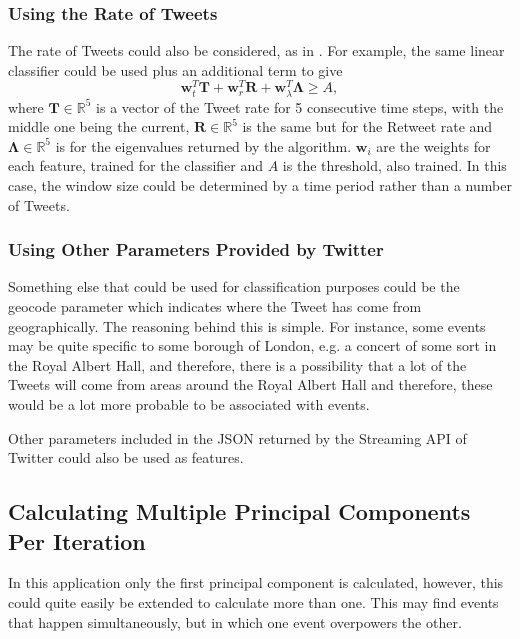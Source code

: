 \documentclass[11pt,a4paper]{article}
\begin{document}
\subsubsection{Using the Rate of Tweets}
The rate of Tweets could also be considered, as in \cite{eventtwitter}. 
For example, the same linear classifier could be used plus an additional term to give
\begin{equation*}
\mathbf{w}_t^T \mathbf{T} + \mathbf{w}_r^T \mathbf{R} + \mathbf{w}_\lambda^T \mathbf{\Lambda} \geq A,
\end{equation*}
where $\mathbf{T} \in \mathbb{R}^5$ is a vector of the Tweet rate for 5 consecutive time steps, with the middle one being the current, $\mathbf{R} \in \mathbb{R}^5$ is the same but for the Retweet rate and $\mathbf{\Lambda} \in \mathbb{R}^5$ is for the eigenvalues returned by the algorithm. $\mathbf{w}_i$ are the weights for each feature, trained for the classifier and $A$ is the threshold, also trained.
In this case, the window size could be determined by a time period rather than a number of Tweets.

\subsubsection{Using Other Parameters Provided by Twitter}
Something else that could be used for classification purposes could be the geocode parameter which indicates where the Tweet has come from geographically. The reasoning behind this is simple. For instance, some events may be quite specific to some borough of London, e.g. a concert of some sort in the Royal Albert Hall, and therefore, there is a possibility that a lot of the Tweets will come from areas around the Royal Albert Hall and therefore, these would be a lot more probable to be associated with events. 

Other parameters included in the JSON returned by the Streaming API of Twitter could also be used as features. 

\subsection{Calculating Multiple Principal Components Per Iteration}
In this application only the first principal component is calculated, however, this could quite easily be extended to calculate more than one. This may find events that happen simultaneously, but in which one event overpowers the other. 

\clearpage
\end{document}
